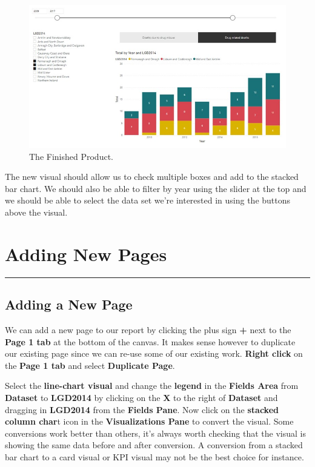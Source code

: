 \documentclass[
]{book}
\begin{document}
\begin{figure}
\centering
\includegraphics{bi10.jpg}
\caption{The Finished Product.}
\end{figure}

The new visual should allow us to check multiple boxes and add to the stacked bar chart. We should also be able to filter by year using the slider at the top and we should be able to select the data set we're interested in using the buttons above the visual.

\hypertarget{adding-new-pages}{%
\chapter{Adding New Pages}\label{adding-new-pages}}

\begin{center}\rule{0.5\linewidth}{0.5pt}\end{center}

\hypertarget{adding-a-new-page}{%
\section{Adding a New Page}\label{adding-a-new-page}}

We can add a new page to our report by clicking the plus sign \textbf{+} next to the \textbf{Page 1 tab} at the bottom of the canvas. It makes sense however to duplicate our existing page since we can re-use some of our existing work. \textbf{Right click} on the \textbf{Page 1 tab} and select \textbf{Duplicate Page}.

Select the \textbf{line-chart visual} and change the \textbf{legend} in the \textbf{Fields Area} from \textbf{Dataset} to \textbf{LGD2014} by clicking on the \textbf{X} to the right of \textbf{Dataset} and dragging in \textbf{LGD2014} from the \textbf{Fields Pane}. Now click on the \textbf{stacked column char}t icon in the \textbf{Visualizations Pane} to convert the visual. Some conversions work better than others, it's always worth checking that the visual is showing the same data before and after conversion. A conversion from a stacked bar chart to a card visual or KPI visual may not be the best choice for instance.
\end{document}
